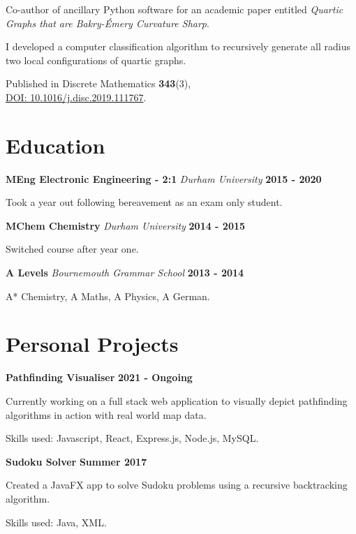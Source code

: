 \documentclass[a4paper, 11pt, hidelinks]{article}
\newcommand{\textsb}[1]{
	\fontseries{sb}\selectfont #1 \normalfont
}
\newcommand{\xp}[3]{
	\vspace{0.25em}
	\textbf{\large#1} \quad \emph{\large#2} \hfill \textbf{\large#3}
}
\begin{document}
\begin{minipage}{0.587\textwidth}
\begin{itemise}
			\item Co-author of ancillary Python software for an academic paper entitled \emph{Quartic Graphs that are Bakry-Émery Curvature Sharp}.
			\item I developed a computer classification algorithm to recursively generate all radius two local configurations of quartic graphs.
			\item Published in Discrete Mathematics \textbf{343}(3),\\ \href{https://arxiv.org/abs/1902.10665}{DOI: 10.1016/j.disc.2019.111767}.
			\hfill
			\href{https://www.francisgurr.com/pages/summer_project/summer_project.html}{\faExternalLink}
		\end{itemise}
		
		\section{Education}
		\xp{MEng Electronic Engineering - 2:1}{Durham University}{2015 - 2020}
		\begin{itemise}
			\item Took a year out following bereavement as an exam only student.
		\end{itemise}
		\xp{MChem Chemistry}{Durham University}{2014 - 2015}
		\begin{itemise}
			\item Switched course after year one.
		\end{itemise}
		\xp{A Levels}{Bournemouth Grammar School}{2013 - 2014}
		\begin{itemise}
			\item A* Chemistry, A Maths, A Physics, A German.
		\end{itemise}
		
		\section{Personal Projects}
    \xp{Pathfinding Visualiser}{}{2021 - Ongoing}
		\begin{itemise}
      \item Currently working on a full stack web application to visually depict pathfinding algorithms in action with real world map data.
      \item \textsb{Skills used:} Javascript, React, Express.js, Node.js, MySQL.
		\end{itemise}
		    \xp{Sudoku Solver}{}{Summer 2017}
		\begin{itemise}
      \item Created a JavaFX app to solve Sudoku problems using a recursive backtracking algorithm.
      \item \textsb{Skills used:} Java, XML.
		\end{itemise}
	\end{minipage}
\end{document}

